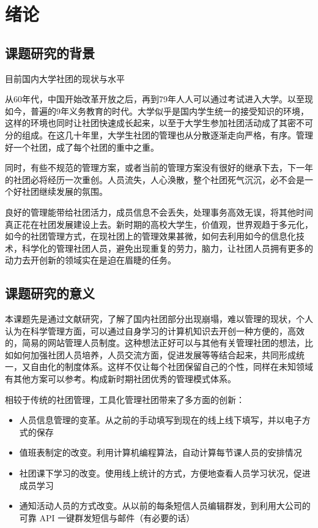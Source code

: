 \chapter{绪论}
\label{cha:introduction}

\section{课题研究的背景}
\label{sec:research-background}

目前国内大学社团的现状与水平

从60年代，中国开始改革开放之后，再到79年人人可以通过考试进入大学。以至现如今，普遍的9年义务教育的时代。大学似乎是国内学生统一的接受知识的环境，这样的环境也同时让社团快速成长起来，以至于大学生参加社团活动成了其密不可分的组成。在这几十年里，大学生社团的管理也从分散逐渐走向严格，有序。管理好一个社团，成了每个社团的重中之重。

同时，有些不规范的管理方案，或者当前的管理方案没有很好的继承下去，下一年的社团必将经历一次重创。人员流失，人心涣散，整个社团死气沉沉，必不会是一个好社团继续发展的氛围。

良好的管理能带给社团活力，成员信息不会丢失，处理事务高效无误，将其他时间真正花在社团发展建设上去。新时期的高校大学生，价值观，世界观趋于多元化，如今的社团管理方式，在现社团上的管理效果甚微，如何去利用如今的信息化技术，科学化的管理社团人员，避免出现重复的劳力，脑力，让社团人员拥有更多的动力去开创新的领域实在是迫在眉睫的任务。

\section{课题研究的意义}
\label{sec:significance-of-research}

本课题先是通过文献研究，了解了国内社团部分出现崩塌，难以管理的现状，个人认为在科学管理方面，可以通过自身学习的计算机知识去开创一种方便的，高效的，简易的网站管理人员制度。这种想法正好可以与其他有关管理社团的想法，比如如何加强社团人员培养，人员交流方面，促进发展等等结合起来，共同形成统一，又自由化的制度体系。这样不仅让每个社团保留自己的个性，同样在未知领域有其他方案可以参考。构成新时期社团优秀的管理模式体系。

相较于传统的社团管理，工具化管理社团带来了多方面的创新：

\begin{itemize}
  \item 人员信息管理的变革。从之前的手动填写到现在的线上线下填写，并以电子方式的保存
  \item 值班表制定的改变。利用计算机编程算法，自动计算每节课人员的安排情况
  \item 社团课下学习的改变。使用线上统计的方式，方便地查看人员学习状况，促进成员学习
  \item 通知活动人员的方式改变。从以前的每条短信人员编辑群发，到利用大公司的可靠 API 一键群发短信与邮件（有必要的话）
\end{itemize}

